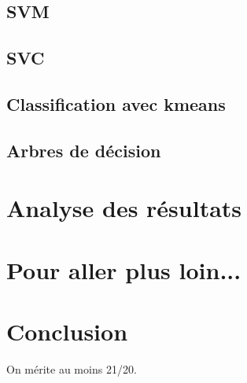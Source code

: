 \documentclass[11pt,a4paper]{article}
\begin{document}
	\subsection{SVM}


	\subsection{SVC}
	\subsection{Classification avec kmeans}
	\subsection{Arbres de décision}

\section{Analyse des résultats}

\section{Pour aller plus loin...}

\section{Conclusion}
	On mérite au moins 21/20.




%
\end{document}
